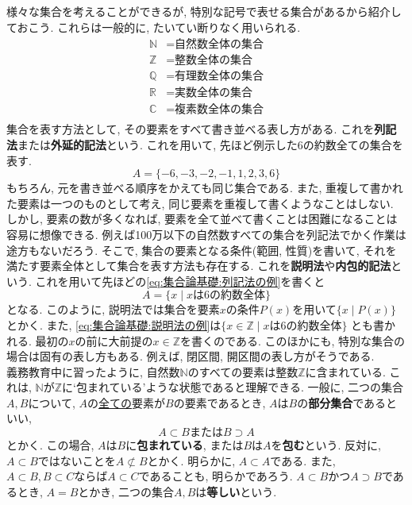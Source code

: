 \documentclass[a4j,dvipdfmx]{jsarticle}
\numberwithin{equation}{section}
\begin{document}
            様々な集合を考えることができるが, 特別な記号で表せる集合があるから紹介しておこう. これらは一般的に, たいてい断りなく用いられる.
            \begin{align*}
                \mathbb{N}&=\text{自然数全体の集合}\\
                \mathbb{Z}&=\text{整数全体の集合}\\
                \mathbb{Q}&=\text{有理数全体の集合}\\
                \mathbb{R}&=\text{実数全体の集合}\\
                \mathbb{C}&=\text{複素数全体の集合}\\
            \end{align*}
            集合を表す方法として, その要素をすべて書き並べる表し方がある. これを\textbf{列記法}または\textbf{外延的記法}という.
            これを用いて, 先ほど例示した6の約数全ての集合を表す.
            \begin{equation}
                A=\{-6,-3,-2,-1,1,2,3,6\} \label{eq:集合論基礎:列記法の例}
            \end{equation}
            もちろん, 元を書き並べる順序をかえても同じ集合である. また, 重複して書かれた要素は一つのものとして考え, 同じ要素を重複して書くようなことはしない.
            しかし, 要素の数が多くなれば, 要素を全て並べて書くことは困難になることは容易に想像できる. 例えば100万以下の自然数すべての集合を列記法でかく作業は途方もないだろう.
            そこで, 集合の要素となる条件(範囲, 性質)を書いて, それを満たす要素全体として集合を表す方法も存在する. これを\textbf{説明法}や\textbf{内包的記法}という.
            これを用いて先ほどの\eqref{eq:集合論基礎:列記法の例}を書くと
            \begin{equation}
                A=\{x\mid\text{$x$は6の約数全体}\} \label{eq:集合論基礎:説明法の例}
            \end{equation}
            となる. このように, 説明法では集合を要素$x$の条件$P(x)$を用いて$\{x\mid P(x)\}$とかく. また, \eqref{eq:集合論基礎:説明法の例}は$\{x\in\mathbb{Z}\mid\text{$x$は6の約数全体}\}$
            とも書かれる. 最初の$x$の前に大前提の$x\in\mathbb{Z}$を書くのである. このほかにも, 特別な集合の場合は固有の表し方もある. 例えば, 閉区間, 開区間の表し方がそうである.\\

            義務教育中に習ったように, 自然数$\mathbb{N}$のすべての要素は整数$\mathbb{Z}$に含まれている. これは, $\mathbb{N}$が$\mathbb{Z}$に`包まれている'ような状態であると理解できる.
            一般に, 二つの集合$A,B$について, $A$の\underline{全ての}要素が$B$の要素であるとき, $A$は$B$の\textbf{部分集合}であるといい,
            \begin{equation}
                A \subset B \text{または} B \supset A \label{eq:集合論基礎:部分集合の表記}
            \end{equation} 
            とかく. この場合, $A$は$B$に\textbf{包まれている}, または$B$は$A$を\textbf{包む}という. 反対に, $A\subset B$ではないことを$A\not\subset B$とかく.
            明らかに, $A\subset A$である. また, $A\subset B,B\subset C$ならば$A\subset C$であることも, 明らかであろう. 
            $A\subset B$かつ$A \supset B$であるとき, $A=B$とかき, 二つの集合$A,B$は\textbf{等しい}という.
\end{document}
